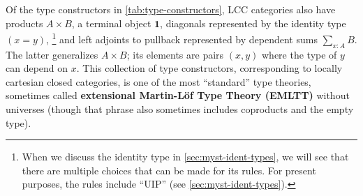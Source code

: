 \documentclass[12pt]{article}
\let\jdeq\equiv
\def\ty{\;\mathsf{type}}
\def\N{\mathbb{N}}
\def\tsm{\textstyle\sum}
\def\proj#1{\mathsf{pr}_{#1}}
\def\types{\vdash}
\def\equiv{\mathsf{Equiv}}
\def\succ{\mathsf{succ}}
\def\unit{\mathbf{1}}
\numberwithin{equation}{section}
\begin{document}
Of the type constructors in \cref{tab:type-constructors}, LCC categories also have products $A\times B$, a terminal object $\unit$, diagonals represented by the identity type $(x=y)$,%
\footnote{When we discuss the identity type in \cref{sec:myst-ident-types}, we will see that there are multiple choices that can be made for its rules.
For present purposes, the rules include ``UIP'' (see \cref{sec:myst-ident-types}).}
and left adjoints to pullback represented by dependent sums $\sum_{x:A} B$.
The latter generalizes $A\times B$; its elements are pairs $(x,y)$ where the type of $y$ can depend on $x$.
This collection of type constructors, corresponding to locally cartesian closed categories, is one of the most ``standard'' type theories, sometimes called \textbf{extensional Martin-L\"of Type Theory (EMLTT)} without universes (though that phrase also sometimes includes coproducts and the empty type).

\end{document}
